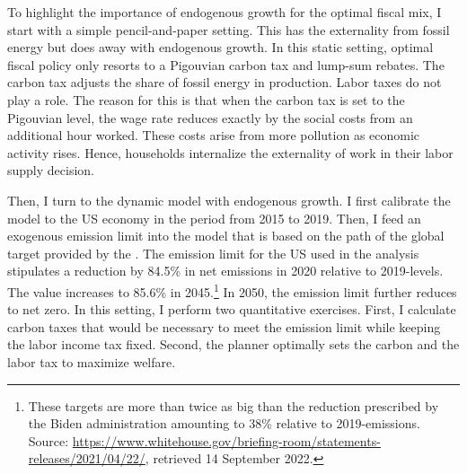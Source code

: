To highlight the importance of endogenous growth for the optimal fiscal mix, I start with a simple pencil-and-paper setting. This has the externality from fossil energy but does away with endogenous growth. In this static setting, optimal fiscal policy only resorts to a Pigouvian carbon tax and lump-sum rebates. The carbon tax adjusts the share of fossil energy in production. Labor taxes do not play a role. The reason for this is that when the carbon tax is set to the Pigouvian level, the wage rate reduces exactly by the social costs from an additional hour worked. These costs arise from more pollution as economic activity rises. Hence, households internalize the externality of work in their labor supply decision.

Then, I turn to the dynamic model with endogenous growth. I first calibrate the model to the US economy in the period from 2015 to 2019. Then, I feed an exogenous emission limit into the model that is based on the path of the global target provided by the \cite{IPCC2022}. The emission limit for the US used in the analysis stipulates a reduction by 84.5\% in net emissions  in 2020 relative to 2019-levels. The value increases to 85.6\% in 2045.\footnote{ These targets are more than twice as big than the reduction prescribed by the Biden administration amounting to 38\% relative to 2019-emissions. Source:  \href{https://www.whitehouse.gov/briefing-room/statements-releases/2021/04/22/fact-sheet-president-biden-sets-2030-greenhouse-gas-pollution-reduction-target-aimed-at-creating-good-paying-union-jobs-and-securing-u-s-leadership-on-clean-energy-technologies/}{https://www.whitehouse.gov/briefing-room/statements-releases/2021/04/22/}, retrieved 14 September 2022.} In 2050, the emission limit further reduces to net zero.
In this setting, I perform two quantitative exercises. First, I calculate carbon taxes that would be necessary to meet the emission limit while keeping the labor income tax fixed. Second,  the planner optimally sets the carbon and the labor tax to maximize welfare.

